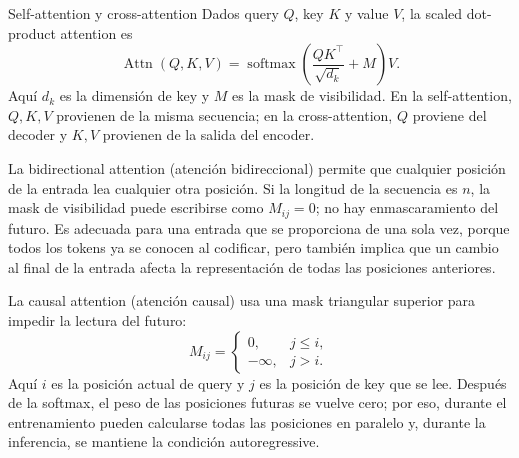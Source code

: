 
\begin{importantbox}{Self-attention y cross-attention}
Dados query $Q$, key $K$ y value $V$, la scaled dot-product attention es
\[
\operatorname{Attn}(Q,K,V)=\operatorname{softmax}\!\left(\frac{QK^{\top}}{\sqrt{d_k}}+M\right)V.
\]
Aquí $d_k$ es la dimensión de key y $M$ es la mask de visibilidad. En la self-attention, $Q,K,V$ provienen de la misma secuencia; en la cross-attention, $Q$ proviene del decoder y $K,V$ provienen de la salida del encoder.
\end{importantbox}


La bidirectional attention (atención bidireccional) permite que cualquier posición de la entrada lea cualquier otra posición. Si la longitud de la secuencia es $n$, la mask de visibilidad puede escribirse como $M_{ij}=0$; no hay enmascaramiento del futuro. Es adecuada para una entrada que se proporciona de una sola vez, porque todos los tokens ya se conocen al codificar, pero también implica que un cambio al final de la entrada afecta la representación de todas las posiciones anteriores.


La causal attention (atención causal) usa una mask triangular superior para impedir la lectura del futuro:
\[
M_{ij}=\begin{cases}
0,&j\le i,\\
-\infty,&j>i.
\end{cases}
\]
Aquí $i$ es la posición actual de query y $j$ es la posición de key que se lee. Después de la softmax, el peso de las posiciones futuras se vuelve cero; por eso, durante el entrenamiento pueden calcularse todas las posiciones en paralelo y, durante la inferencia, se mantiene la condición autoregressive.



